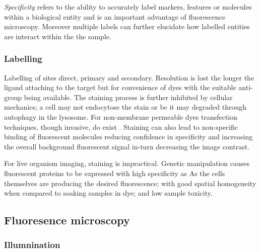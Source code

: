 
\emph{Specificity} refers to the ability to accurately label markers, features or molecules within a biological entity and is an important advantage of fluorescence microscopy.
Moreover multiple labels can further elucidate how labelled entities are interact within the the sample.

\subsubsection{Labelling}


Labelling of sites direct, primary and secondary.
Resolution is lost the longer the ligand attaching to the target but for convenience of dyes with the suitable anti-group being available.
The staining process is further inhibited by cellular mechanics; a cell may not endocytose the stain or be it may degraded through autophagy in the lysosome.
For non-membrane permeable dyes transfection techniques, though invasive, do exist \cite{}.
Staining can also lead to non-specific binding of fluorescent molecules reducing confidence in specificity and increasing the overall background fluorescent signal in-turn decreasing the image contrast.

For live organism imaging, staining is impractical.
Genetic manipulation causes fluorescent proteins to be expressed with high specificity as
As the cells themselves are producing the desired fluorescence; with good spatial homogeneity when compared to soaking samples in dye; and low sample toxicity.


\subsection{Fluoresence microscopy}

\subsubsection{Illumnination}

